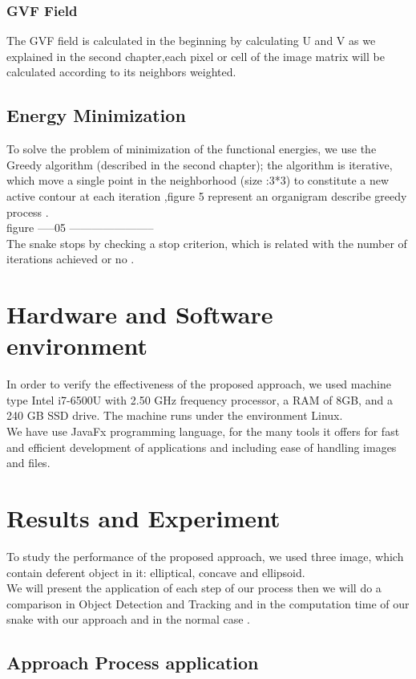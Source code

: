\subsubsection{GVF Field}
The GVF field is calculated in the beginning by calculating U and V as we explained in
the second chapter,each pixel or cell of the image matrix will be calculated according
to its neighbors weighted.
\subsection{Energy Minimization}\label{subsec:energy-minimization}
To solve the problem of minimization of the functional energies, we use the Greedy
algorithm (described in the second chapter); the algorithm is iterative, which move a
single point in the neighborhood (size :3*3) to constitute a new active contour at
each iteration ,figure 5 represent an organigram describe greedy process .
\\figure -----05 -----------------------\\
The snake stops by checking a stop criterion, which is related with the number of
iterations achieved or no .
\section{Hardware and Software environment}\label{sec:hardware-and-software-environment}
In order to verify the effectiveness of the proposed approach, we used machine type
Intel i7-6500U with 2.50 GHz frequency processor, a RAM of 8GB, and a 240 GB SSD
drive. The machine runs under the environment Linux.\\
We have use JavaFx programming language, for the many tools it offers for fast and
efficient development of applications and including ease of handling images and files.
\section{Results and Experiment}\label{sec:results-and-experiment}
To study the performance of the proposed approach, we used three image, which
contain deferent object in it: elliptical, concave and ellipsoid.\\
We will present the application of each step of our process then we will do a
comparison in Object Detection and Tracking and in the computation time of our
snake with our approach and in the normal case .
\subsection{Approach Process application}\label{subsec:approach-process-application}

